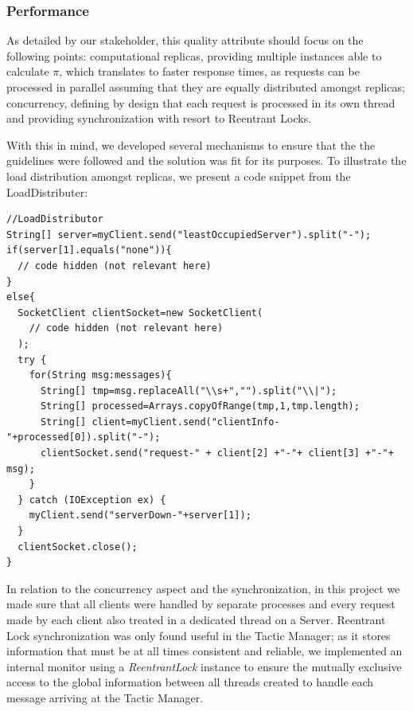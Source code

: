 \documentclass[12pt]{article}
\begin{document}
\subsubsection{Performance} \label{performance}

As detailed by our stakeholder, this quality attribute should focus on the following points: 
computational replicas, providing multiple instances able to calculate $\pi$, which translates to faster response times, as requests can be processed in 
parallel assuming that they are equally distributed amongst replicas;
concurrency, defining by design that each request is processed in its own thread and providing synchronization with resort to Reentrant Locks.

With this in mind, we developed several mechanisms to ensure that the the guidelines were followed and the solution was fit for its purposes.  
To illustrate the load distribution amongst replicas, we present a code snippet from the LoadDistributer:
 
\begin{lstlisting}[label={loadDistributor}]
//LoadDistributor
String[] server=myClient.send("leastOccupiedServer").split("-");
if(server[1].equals("none")){
  // code hidden (not relevant here)
}
else{
  SocketClient clientSocket=new SocketClient(
    // code hidden (not relevant here)
  );
  try {
    for(String msg:messages){
      String[] tmp=msg.replaceAll("\\s+","").split("\\|");
      String[] processed=Arrays.copyOfRange(tmp,1,tmp.length);
      String[] client=myClient.send("clientInfo-"+processed[0]).split("-");
      clientSocket.send("request-" + client[2] +"-"+ client[3] +"-"+ msg);
    }
  } catch (IOException ex) {
    myClient.send("serverDown-"+server[1]);
  }
  clientSocket.close();
}
\end{lstlisting}

In relation to the concurrency aspect and the synchronization, in this project we made sure that all clients were handled by separate processes and every request 
made by each client also treated in a dedicated thread on a Server. 
Reentrant Lock synchronization was only found useful in the Tactic Manager; as it stores information that must be at all times consistent and reliable, we 
implemented an internal monitor using a \textit{ReentrantLock} instance to ensure the mutually exclusive access to the global information between all threads 
created to handle each message arriving at the Tactic Manager.
\end{document}
